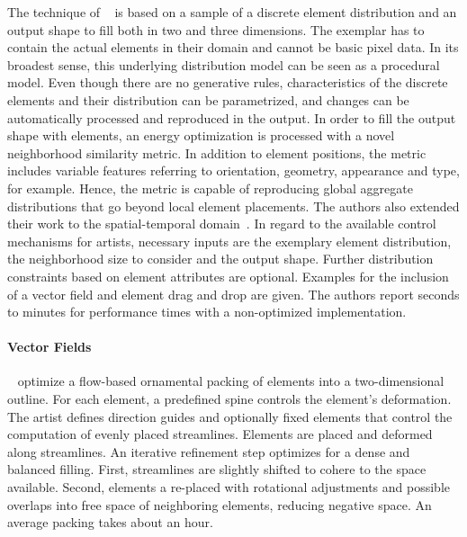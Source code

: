 The technique of \citeauthor*{ma_2011_det}~\cite{ma_2011_det} is based on a sample of a discrete element distribution and an output shape to fill both in two and three dimensions. The exemplar has to contain the actual elements in their domain and cannot be basic pixel data. In its broadest sense, this underlying distribution model can be seen as a procedural model. Even though there are no generative rules, characteristics of the discrete elements and their distribution can be parametrized, and changes can be automatically processed and reproduced in the output. In order to fill the output shape with elements, an energy optimization is processed with a novel neighborhood similarity metric. In addition to element positions, the metric includes  variable features referring to orientation, geometry, appearance and type, for example. Hence, the metric is capable of reproducing global aggregate distributions that go beyond local element placements. The authors also extended their work to the spatial-temporal domain~\cite{ma_2013_det}. In regard to the available control mechanisms for artists, necessary inputs are the exemplary element distribution, the neighborhood size to consider and the output shape. Further distribution constraints based on element attributes are optional. Examples for the inclusion of a vector field and element drag and drop are given. The authors report seconds to minutes for performance times with a non-optimized implementation.




\paragraph{Vector Fields}
\label{para:analysis_element_arrangements_fields}

\citeauthor*{saputra_2017_ffo}~\cite{saputra_2017_ffo} optimize a flow-based ornamental packing of elements into a two-dimensional outline. For each element, a predefined spine controls the element's deformation. The artist defines direction guides and optionally fixed elements that control the computation of evenly placed streamlines. Elements are placed and deformed along streamlines. An iterative refinement step optimizes for a dense and balanced filling. First, streamlines are slightly shifted to cohere to the space available. Second, elements a re-placed with rotational adjustments and possible overlaps into free space of neighboring elements, reducing negative space. An average packing takes about an hour.

